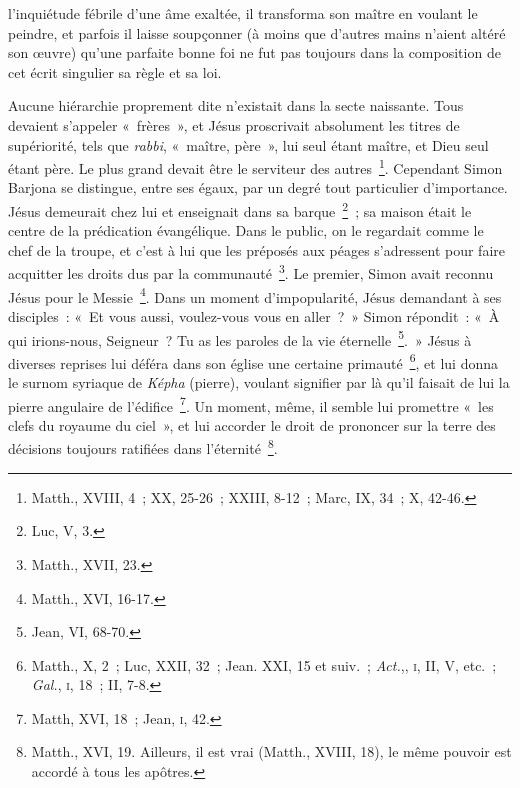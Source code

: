 \documentclass[french,twoside]{book} %
\begin{document}
l’inquiétude fébrile d’une âme exaltée, il transforma son maître en voulant le peindre, et parfois il laisse soupçonner (à moins que d’autres mains n’aient altéré son œuvre) qu’une parfaite bonne foi ne fut pas toujours dans la composition de cet écrit singulier sa règle et sa loi.\par
Aucune hiérarchie proprement dite n’existait dans la secte naissante. Tous devaient s’appeler « frères », et Jésus proscrivait absolument les titres de supériorité, tels que {\itshape rabbi}, « maître, père », lui seul étant maître, et Dieu seul étant père. Le plus grand devait être le serviteur des autres \footnote{Matth., XVIII, 4 ; XX, 25-26 ; XXIII, 8-12 ; Marc, IX, 34 ; X, 42-46.}. Cependant Simon Barjona se distingue, entre ses égaux, par un degré tout particulier d’importance. Jésus demeurait chez lui et enseignait dans sa barque \footnote{Luc, V, 3.} ; sa maison était le centre de la prédication évangélique. Dans le public, on le regardait comme le chef de la troupe, et c’est à lui que les préposés aux péages s’adressent pour faire acquitter les droits dus par la communauté \footnote{Matth., XVII, 23.}. Le premier, Simon avait reconnu Jésus pour le Messie \footnote{Matth., XVI, 16-17.}. Dans un moment d’impopularité, Jésus demandant à ses disciples : « Et vous aussi, voulez-vous vous en aller ? » Simon répondit : « À qui irions-nous, Seigneur ? Tu as les paroles de la vie éternelle \footnote{Jean, VI, 68-70.}. » Jésus à diverses reprises lui déféra dans son église une certaine primauté \footnote{ Matth., X, 2 ; Luc, XXII, 32 ; Jean. XXI, 15 et suiv. ; {\itshape Act.},, \textsc{i}, II, V, etc. ; {\itshape Gal.}, \textsc{i}, 18 ; II, 7-8.}, et lui donna le surnom syriaque de {\itshape Képha} (pierre), voulant signifier par là qu’il faisait de lui la pierre angulaire de l’édifice \footnote{ Matth, XVI, 18 ; Jean, \textsc{i}, 42.}. Un moment, même, il semble lui promettre « les clefs du royaume du ciel », et lui accorder le droit de prononcer sur la terre des décisions toujours ratifiées dans l’éternité \footnote{ Matth., XVI, 19. Ailleurs, il est vrai (Matth., XVIII, 18), le même pouvoir est accordé à tous les apôtres.}.\par
\end{document}
